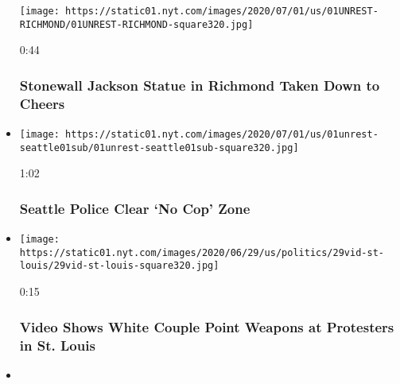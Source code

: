 \begin{itemize}
  \texttt{[image: https://static01.nyt.com/images/2020/07/01/us/01UNREST-RICHMOND/01UNREST-RICHMOND-square320.jpg]}

  0:44

  \hypertarget{stonewall-jackson-statue-in-richmond-taken-down-to-cheers}{%
  \subsubsection{Stonewall Jackson Statue in Richmond Taken Down to
  Cheers}\label{stonewall-jackson-statue-in-richmond-taken-down-to-cheers}}
\item
  \href{https://www.nytimes.com/video/us/politics/100000007218978/seattle-police-autonomous-zone.html?action=click\&module=video-series-bar\&region=header\&pgtype=Article\&playlistId=video/minneapolis-george-floyd-death-video}{}

  \texttt{[image: https://static01.nyt.com/images/2020/07/01/us/01unrest-seattle01sub/01unrest-seattle01sub-square320.jpg]}

  1:02

  \hypertarget{seattle-police-clear-no-cop-zone}{%
  \subsubsection{Seattle Police Clear `No Cop'
  Zone}\label{seattle-police-clear-no-cop-zone}}
\item
  \href{https://www.nytimes.com/video/us/politics/100000007214585/trump-white-couple-guns-st-louis.html?action=click\&module=video-series-bar\&region=header\&pgtype=Article\&playlistId=video/minneapolis-george-floyd-death-video}{}

  \texttt{[image: https://static01.nyt.com/images/2020/06/29/us/politics/29vid-st-louis/29vid-st-louis-square320.jpg]}

  0:15

  \hypertarget{video-shows-white-couple-point-weapons-at-protesters-in-st-louis}{%
  \subsubsection{Video Shows White Couple Point Weapons at Protesters in
  St.
  Louis}\label{video-shows-white-couple-point-weapons-at-protesters-in-st-louis}}
\item
  \href{https://www.nytimes.com/video/us/100000007214015/louisville-shooting-press-briefing.html?action=click\&module=video-series-bar\&region=header\&pgtype=Article\&playlistId=video/minneapolis-george-floyd-death-video}{}


\end{itemize}
